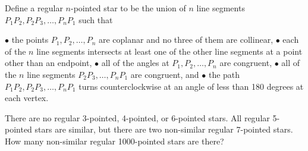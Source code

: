 Define a regular $n$-pointed star to be the union of $n$ line segments $P_1P_2, P_2P_3,\ldots, P_nP_1$ such that

$\bullet$ the points $P_1, P_2,\ldots, P_n$ are coplanar and no three of them are collinear,
$\bullet$ each of the $n$ line segments intersects at least one of the other line segments at a point other than an endpoint,
$\bullet$ all of the angles at $P_1, P_2,\ldots, P_n$ are congruent,
$\bullet$ all of the $n$ line segments $P_2P_3,\ldots, P_nP_1$ are congruent, and
$\bullet$ the path $P_1P_2, P_2P_3,\ldots, P_nP_1$ turns counterclockwise at an angle of less than 180 degrees at each vertex.

There are no regular 3-pointed, 4-pointed, or 6-pointed stars. All regular 5-pointed stars are similar, but there are two non-similar regular 7-pointed stars. How many non-similar regular 1000-pointed stars are there?